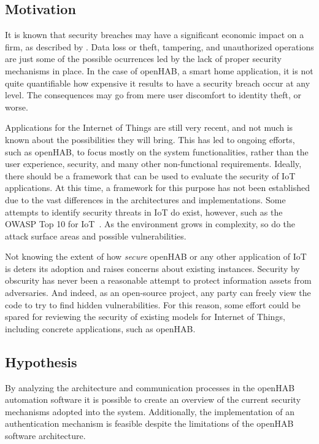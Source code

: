 \documentclass[12pt]{article}
\begin{document}
\subsection{Motivation}

It is known that security breaches may have a significant economic impact on a firm, as described by \citet{GOEL}. Data loss or theft, tampering, and unauthorized operations are just some of the possible ocurrences led by the lack of proper security mechanisms in place. In the case of openHAB, a smart home application, it is not quite quantifiable how expensive it results to have a security breach occur at any level. The consequences may go from mere user discomfort to identity theft, or worse.

Applications for the Internet of Things are still very recent, and not much is known about the possibilities they will bring. This has led to ongoing efforts, such as openHAB, to focus mostly on the system functionalities, rather than the user experience, security, and many other non-functional requirements. Ideally, there should be a framework that can be used to evaluate the security of IoT applications. At this time, a framework for this purpose has not been established due to the vast differences in the architectures and implementations. Some attempts to identify security threats in IoT do exist, however, such as the OWASP Top 10 for IoT~\cite{owasp}. As the environment grows in complexity, so do the attack surface areas and possible vulnerabilities.

Not knowing the extent of how \emph{secure} openHAB or any other application of IoT is deters its adoption and raises concerns about existing instances. Security by obscurity has never been a reasonable attempt to protect information assets from adversaries. And indeed, as an open-source project, any party can freely view the code to try to find hidden vulnerabilities. For this reason, some effort could be spared for reviewing the security of existing models for Internet of Things, including concrete applications, such as openHAB.

\subsection{Hypothesis}

By analyzing the architecture and communication processes in the openHAB automation software it is possible to create an overview of the current security mechanisms adopted into the system. Additionally, the implementation of an authentication mechanism is feasible despite the limitations of the openHAB software architecture.
\end{document}
